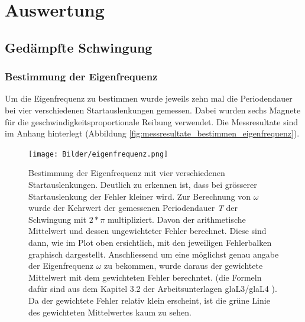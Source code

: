 \chapter{Auswertung}
\thispagestyle{fancy}
\section{Gedämpfte Schwingung}
\subsection{Bestimmung der Eigenfrequenz}
Um die Eigenfrequenz zu bestimmen wurde jeweils zehn mal die Periodendauer bei vier verschiedenen Startauslenkungen gemessen. Dabei wurden sechs Magnete für die geschwindigkeitsproportionale Reibung verwendet. Die Messresultate sind im Anhang hinterlegt (Abbildung \ref{fig:messresultate_bestimmen_eigenfrequenz}).\\
\vspace{-0.4cm}
\begin{figure}[h]
\centering
\texttt{[image: Bilder/eigenfrequenz.png]} 
\vspace*{-2.8cm}
\caption{Bestimmung der Eigenfrequenz mit vier verschiedenen Startauslenkungen. Deutlich zu erkennen ist, dass bei grösserer 					Startauslenkung der Fehler kleiner wird. Zur Berechnung von $\omega$ wurde der Kehrwert der gemessenen Periodendauer \textit{T} 		der Schwingung mit $2*\pi$ multipliziert. Davon der arithmetische Mittelwert und dessen ungewichteter Fehler berechnet. Diese sind dann, wie im Plot oben ersichtlich, mit den jeweiligen Fehlerbalken graphisch dargestellt. Anschliessend um eine möglichst genau angabe der Eigenfrequenz $\omega$ zu bekommen, wurde daraus der gewichtete Mittelwert mit dem gewichteten Fehler berechntet. (die Formeln dafür sind aus dem Kapitel 3.2 der Arbeitsunterlagen glaL3/glaL4 \cite{TechnikFHNW2016}). Da der gewichtete Fehler relativ klein erscheint, ist die grüne Linie des gewichteten Mittelwertes kaum zu sehen. }
\label{fig:eigenfrequenz}
\end{figure}
\newpage
